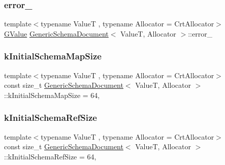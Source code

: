 \mbox{\label{classGenericSchemaDocument_ac5acc747fac790c69ae35fd4b62e3aa6}} 
\subsubsection{\texorpdfstring{error\+\_\+}{error\_}}
{\footnotesize\ttfamily template$<$typename ValueT , typename Allocator  = Crt\+Allocator$>$ \\
\hyperlink{classGenericSchemaDocument_a777505b09fff6cf23b8cfed9e0350eec}{G\+Value} \hyperlink{classGenericSchemaDocument}{Generic\+Schema\+Document}$<$ ValueT, Allocator $>$\+::error\+\_\+\hspace{0.3cm}{\ttfamily [private]}}

\mbox{\label{classGenericSchemaDocument_a3b0a57801ee25f2ba84ce61770291c33}} 
\subsubsection{\texorpdfstring{k\+Initial\+Schema\+Map\+Size}{kInitialSchemaMapSize}}
{\footnotesize\ttfamily template$<$typename ValueT , typename Allocator  = Crt\+Allocator$>$ \\
const size\+\_\+t \hyperlink{classGenericSchemaDocument}{Generic\+Schema\+Document}$<$ ValueT, Allocator $>$\+::k\+Initial\+Schema\+Map\+Size = 64\hspace{0.3cm}{\ttfamily [static]}, {\ttfamily [private]}}

\mbox{\label{classGenericSchemaDocument_a5a3e961495b724dc65682d6a0a681d03}} 
\subsubsection{\texorpdfstring{k\+Initial\+Schema\+Ref\+Size}{kInitialSchemaRefSize}}
{\footnotesize\ttfamily template$<$typename ValueT , typename Allocator  = Crt\+Allocator$>$ \\
const size\+\_\+t \hyperlink{classGenericSchemaDocument}{Generic\+Schema\+Document}$<$ ValueT, Allocator $>$\+::k\+Initial\+Schema\+Ref\+Size = 64\hspace{0.3cm}{\ttfamily [static]}, {\ttfamily [private]}}


